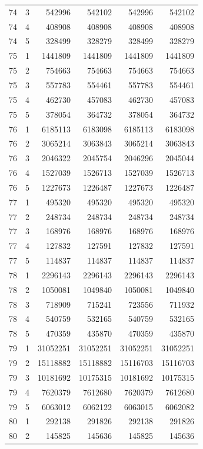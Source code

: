 \begin{longtable}{rrrrrr}
74 & 3 & 542996 & 542102 & 542996 & 542102 \\
74 & 4 & 408908 & 408908 & 408908 & 408908 \\
74 & 5 & 328499 & 328279 & 328499 & 328279 \\
75 & 1 & 1441809 & 1441809 & 1441809 & 1441809 \\
75 & 2 & 754663 & 754663 & 754663 & 754663 \\
75 & 3 & 557783 & 554461 & 557783 & 554461 \\
75 & 4 & 462730 & 457083 & 462730 & 457083 \\
75 & 5 & 378054 & 364732 & 378054 & 364732 \\
76 & 1 & 6185113 & 6183098 & 6185113 & 6183098 \\
76 & 2 & 3065214 & 3063843 & 3065214 & 3063843 \\
76 & 3 & 2046322 & 2045754 & 2046296 & 2045044 \\
76 & 4 & 1527039 & 1526713 & 1527039 & 1526713 \\
76 & 5 & 1227673 & 1226487 & 1227673 & 1226487 \\
77 & 1 & 495320 & 495320 & 495320 & 495320 \\
77 & 2 & 248734 & 248734 & 248734 & 248734 \\
77 & 3 & 168976 & 168976 & 168976 & 168976 \\
77 & 4 & 127832 & 127591 & 127832 & 127591 \\
77 & 5 & 114837 & 114837 & 114837 & 114837 \\
78 & 1 & 2296143 & 2296143 & 2296143 & 2296143 \\
78 & 2 & 1050081 & 1049840 & 1050081 & 1049840 \\
78 & 3 & 718909 & 715241 & 723556 & 711932 \\
78 & 4 & 540759 & 532165 & 540759 & 532165 \\
78 & 5 & 470359 & 435870 & 470359 & 435870 \\
79 & 1 & 31052251 & 31052251 & 31052251 & 31052251 \\
79 & 2 & 15118882 & 15118882 & 15116703 & 15116703 \\
79 & 3 & 10181692 & 10175315 & 10181692 & 10175315 \\
79 & 4 & 7620379 & 7612680 & 7620379 & 7612680 \\
79 & 5 & 6063012 & 6062122 & 6063015 & 6062082 \\
80 & 1 & 292138 & 291826 & 292138 & 291826 \\
80 & 2 & 145825 & 145636 & 145825 & 145636 \\

\end{longtable}
